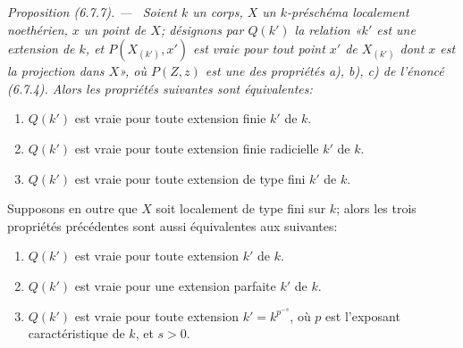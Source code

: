 \documentclass[10pt,oneside]{book}
\newenvironment{proposition}[1][]{%
  \par\medskip\noindent\itshape Proposition (#1). ---\ }{\par}
\begin{document}
\begin{proposition}[6.7.7]
\label{IV.2.s6.7.7-fr}
Soient $k$ un corps, $X$ un $k$-préschéma localement noethérien, $x$ un
point de $X$; désignons par $Q(k')$ la relation «$k'$ est une extension de
$k$, et $P(X_{(k')},x')$ est vraie pour tout point $x'$ de $X_{(k')}$ dont
$x$ est la projection dans $X$», où $P(Z,z)$ est une des propriétés a),
b), c) de l'énoncé (6.7.4). Alors les propriétés suivantes sont équivalentes:
\begin{enumerate}
\item[a)] $Q(k')$ est vraie pour toute extension finie $k'$ de $k$.
\item[b)] $Q(k')$ est vraie pour toute extension finie radicielle $k'$ de $k$.
\item[c)] $Q(k')$ est vraie pour toute extension de type fini $k'$ de $k$.
\end{enumerate}
Supposons en outre que $X$ soit localement de type fini sur $k$; alors les
trois propriétés précédentes sont aussi équivalentes aux suivantes:
\begin{enumerate}
\item[d)] $Q(k')$ est vraie pour toute extension $k'$ de $k$.
\item[e)] $Q(k')$ est vraie pour une extension parfaite $k'$ de $k$.
\item[f)] $Q(k')$ est vraie pour toute extension $k'=k^{p^{-s}}$, où $p$ est
l'exposant caractéristique de $k$, et $s>0$.
\end{enumerate}
\end{proposition}
\end{document}
